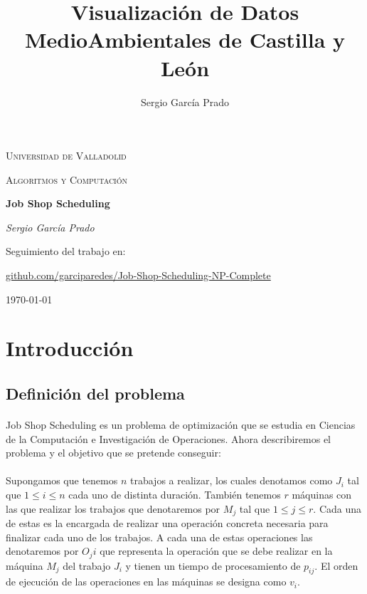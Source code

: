 \documentclass[11pt, a4paper,spanish]{article}
\title{Visualización de Datos MedioAmbientales de Castilla y León}
\author{Sergio García Prado}
\begin{document}
	\begin{titlepage}
		\centering
		{\scshape\LARGE Universidad de Valladolid \par}
		
		\vspace{1cm}
		{\scshape\Large Algoritmos y Computación\par}
		
		\vspace{1.5cm}
		{\huge\bfseries Job Shop Scheduling\par}
		
		\vspace{2cm}
		{\Large\itshape Sergio García Prado\par}

		\vfill
		Seguimiento del trabajo en: \par
		\href{https://github.com/garciparedes/Job-Shop-Scheduling-NP-Complete}{github.com/garciparedes/Job-Shop-Scheduling-NP-Complete}
		\vfill

		{\large \today\par}
	\end{titlepage}

	\newpage
		\tableofcontents
	\newpage
	
		\section{Introducción}
		
			\subsection{Definición del problema}
			
				\paragraph{}
				Job Shop Scheduling es un problema de optimización que se estudia en Ciencias de la Computación e Investigación de Operaciones. Ahora describiremos el problema y el objetivo que se pretende conseguir:
			
				\paragraph{}
				Supongamos que tenemos $n$ trabajos a realizar, los cuales denotamos como $J_{i}$ tal que $1 \leq i \leq n$ cada uno de distinta duración. También tenemos $r$ máquinas con las que realizar los trabajos que denotaremos por $M_{j}$ tal que $1 \leq j \leq r$. Cada una de estas es la encargada de realizar una operación concreta necesaria para finalizar cada uno de los trabajos. A cada una de estas operaciones las denotaremos por  $O_{j}{i}$ que representa la operación que se debe realizar en la máquina  $M_{j}$ del trabajo $J_{i}$ y tienen un tiempo de procesamiento de $p_{ij}$. El orden de ejecución de las operaciones en las máquinas se designa como $v_{i}$.
\end{document}
